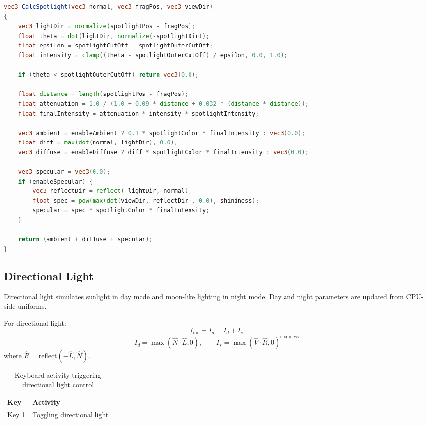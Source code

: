 \documentclass[12pt,a4paper]{report}
\begin{document}
\begin{lstlisting}[language=GLSL]
vec3 CalcSpotlight(vec3 normal, vec3 fragPos, vec3 viewDir)
{
    vec3 lightDir = normalize(spotlightPos - fragPos);
    float theta = dot(lightDir, normalize(-spotlightDir));
    float epsilon = spotlightCutOff - spotlightOuterCutOff;
    float intensity = clamp((theta - spotlightOuterCutOff) / epsilon, 0.0, 1.0);

    if (theta < spotlightOuterCutOff) return vec3(0.0);

    float distance = length(spotlightPos - fragPos);
    float attenuation = 1.0 / (1.0 + 0.09 * distance + 0.032 * (distance * distance));
    float finalIntensity = attenuation * intensity * spotlightIntensity;

    vec3 ambient = enableAmbient ? 0.1 * spotlightColor * finalIntensity : vec3(0.0);
    float diff = max(dot(normal, lightDir), 0.0);
    vec3 diffuse = enableDiffuse ? diff * spotlightColor * finalIntensity : vec3(0.0);

    vec3 specular = vec3(0.0);
    if (enableSpecular) {
        vec3 reflectDir = reflect(-lightDir, normal);
        float spec = pow(max(dot(viewDir, reflectDir), 0.0), shininess);
        specular = spec * spotlightColor * finalIntensity;
    }

    return (ambient + diffuse + specular);
}
\end{lstlisting}

\subsection{Directional Light}
Directional light simulates sunlight in day mode and moon-like lighting in night mode. Day and night parameters are updated from CPU-side uniforms.


For directional light:
\[
I_{\text{dir}} = I_a + I_d + I_s
\]
\[
I_d = \max(\hat{N}\cdot\hat{L}, 0), \qquad
I_s = \max(\hat{V}\cdot\hat{R}, 0)^{\text{shininess}}
\]
where $\hat{R}=\text{reflect}(-\hat{L},\hat{N})$.

\begin{table}[h]
\centering
\caption{Keyboard activity triggering directional light control}
\begin{tabular}{|l|l|}
\hline
\textbf{Key} & \textbf{Activity} \\
\hline
Key 1 & Toggling directional light \\
\hline
\end{tabular}
\end{table}
\end{document}
